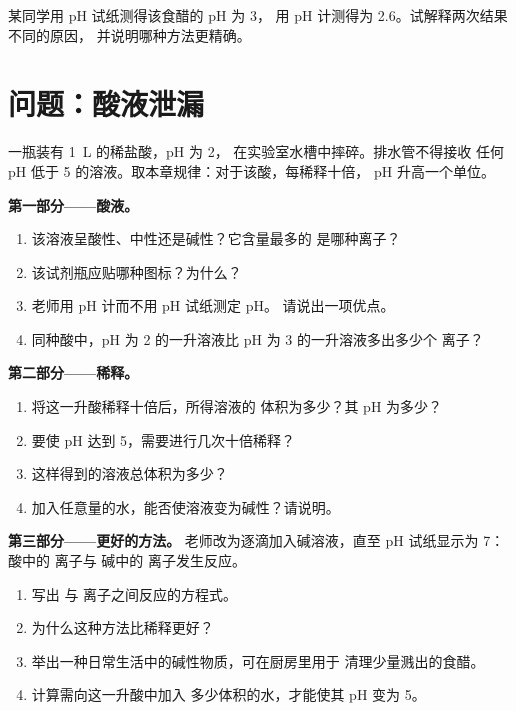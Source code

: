 \begin{exercise}[$\star\star\star$]\label{exo:g9:acids-bases-ph:12}
某同学用 pH 试纸测得该食醋的 pH 为 3，
用 pH 计测得为 2.6。试解释两次结果不同的原因，
并说明哪种方法更精确。
\end{exercise}

\section{问题：酸液泄漏}

\begin{problem}
\label{pb:g9:acids-bases-ph:1}
一瓶装有 \qty{1}{L} 的稀盐酸，pH 为 2，
在实验室水槽中摔碎。排水管不得接收
任何 pH 低于 5 的溶液。取本章规律：对于该酸，每稀释十倍，
pH 升高一个单位。

\medskip
\noindent\textbf{第一部分——酸液。}
\begin{enumerate}
  \item 该溶液呈酸性、中性还是碱性？它含量最多的
        是哪种离子？
  \item 该试剂瓶应贴哪种图标？为什么？
  \item 老师用 pH 计而不用 pH 试纸测定 pH。
        请说出一项优点。
  \item 同种酸中，pH 为 2 的一升溶液比
        pH 为 3 的一升溶液多出多少个  离子？
\end{enumerate}

\medskip
\noindent\textbf{第二部分——稀释。}
\begin{enumerate}[resume]
  \item 将这一升酸稀释十倍后，所得溶液的
        体积为多少？其 pH 为多少？
  \item 要使 pH 达到 5，需要进行几次十倍稀释？
  \item 这样得到的溶液总体积为多少？
  \item 加入任意量的水，能否使溶液变为碱性？请说明。
\end{enumerate}

\medskip
\noindent\textbf{第三部分——更好的方法。}
老师改为逐滴加入碱溶液，直至
pH 试纸显示为 7：酸中的  离子与
碱中的  离子发生反应。
\begin{enumerate}[resume]
  \item 写出  与 
        离子之间反应的方程式。
  \item 为什么这种方法比稀释更好？
  \item 举出一种日常生活中的碱性物质，可在厨房里用于
        清理少量溅出的食醋。
  \item 计算需向这一升酸中加入
        多少体积的水，才能使其 pH 变为 5。
\end{enumerate}
\end{problem}
